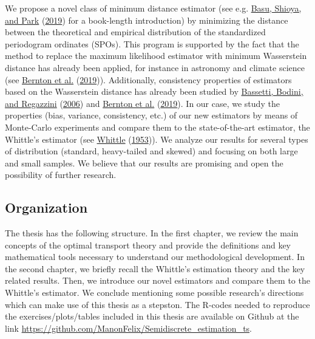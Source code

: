 \documentclass[
  11pt,
]{article}
\begin{document}
We propose a novel class of minimum distance estimator (see e.g.
\protect\hyperlink{ref-basu2019statistical}{Basu, Shioya, and Park}
(\protect\hyperlink{ref-basu2019statistical}{2019}) for a book-length
introduction) by minimizing the distance between the theoretical and
empirical distribution of the standardized periodogram ordinates (SPOs).
This program is supported by the fact that the method to replace the
maximum likelihood estimator with minimum Wasserstein distance has
already been applied, for instance in astronomy and climate science (see
\protect\hyperlink{ref-bernton2019parameter}{Bernton et al.}
(\protect\hyperlink{ref-bernton2019parameter}{2019})). Additionally,
consistency properties of estimators based on the Wasserstein distance
has already been studied by
\protect\hyperlink{ref-bassetti2006minimum}{Bassetti, Bodini, and
Regazzini} (\protect\hyperlink{ref-bassetti2006minimum}{2006}) and
\protect\hyperlink{ref-bernton2019parameter}{Bernton et al.}
(\protect\hyperlink{ref-bernton2019parameter}{2019}). In our case, we
study the properties (bias, variance, consistency, etc.) of our new
estimators by means of Monte-Carlo experiments and compare them to the
state-of-the-art estimator, the Whittle's estimator (see
\protect\hyperlink{ref-whittle1953estimation}{Whittle}
(\protect\hyperlink{ref-whittle1953estimation}{1953})). We analyze our
results for several types of distribution (standard, heavy-tailed and
skewed) and focusing on both large and small samples. We believe that
our results are promising and open the possibility of further research.

\hypertarget{organization}{%
\subsection{Organization}\label{organization}}

The thesis has the following structure. In the first chapter, we review
the main concepts of the optimal transport theory and provide the
definitions and key mathematical tools necessary to understand our
methodological development. In the second chapter, we briefly recall the
Whittle's estimation theory and the key related results. Then, we
introduce our novel estimators and compare them to the Whittle's
estimator. We conclude mentioning some possible research's directions
which can make use of this thesis as a stepston. The R-codes needed to
reproduce the exercises/plots/tables included in this thesis are
available on Github at the link
\url{https://github.com/ManonFelix/Semidiscrete_estimation_ts}.
\end{document}
